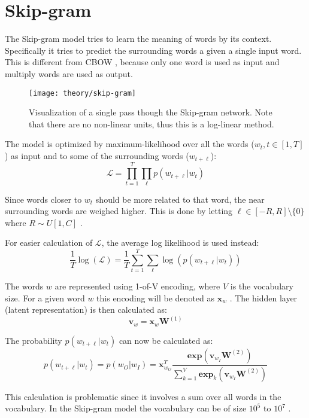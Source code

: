 
\section{Skip-gram}

The Skip-gram model tries to learn the meaning of words by its context. Specifically it tries to predict the surrounding words a given a single input word. This is different from CBOW , because only one word is used as input and multiply words are used as output.

\begin{figure}[H]
	\centering
	\texttt{[image: theory/skip-gram]}
	\caption{Visualization of a single pass though the Skip-gram network. Note that there are no non-linear units, thus this is a log-linear method.}
\end{figure}

The model is optimized by maximum-likelihood over all the words ($w_t, t \in [1, T]$)  as input and to some of the surrounding words ($w_{t + \ell}$):
\begin{equation}
\mathcal{L} = \prod_{t = 1}^T \prod_{\ell} p(w_{t + \ell} | w_t)
\end{equation}

Since words closer to $w_t$ should be more related to that word, the near surrounding words are weighed higher. This is done by letting $\ell \in [-R, R] \setminus \{ 0 \}$ where $R \sim U[1, C]$ \cite{word2vec-comparing}.

For easier calculation of $\mathcal{L}$, the average log likelihood is used instead:
\begin{equation}
\frac{1}{T} \log( \mathcal{L} ) = \frac{1}{T} \sum_{t = 1}^T \sum_{\ell} \log( p(w_{t + \ell} | w_t) )
\end{equation}

The words $w$ are represented using 1-of-V encoding, where $V$ is the vocabulary size. For a given word $w$ this encoding will be denoted as $\mathbf{x}_w$ . The hidden layer (latent representation) is then calculated as:
\begin{equation}
\mathbf{v}_w = \mathbf{x}_w \mathbf{W}^{(1)}
\end{equation} 

The probability $p(w_{t + \ell} | w_t)$ can now be calculated as:
\begin{equation}
p(w_{t + \ell} | w_t) = p(w_O | w_I) = \mathbf{x}_{w_O}^T \frac{
	\mathbf{exp}(\mathbf{v}_{w_I}  \mathbf{W}^{(2)} )
}{
	\sum_{k=1}^V \mathbf{exp}_k(\mathbf{v}_{w_I}  \mathbf{W}^{(2)} )
}
\end{equation}

This calculation is problematic since it involves a sum over all words in the vocabulary. In the Skip-gram model the vocabulary can be of size $10^5$ to $10^7$ \cite{word2vec-details} .
